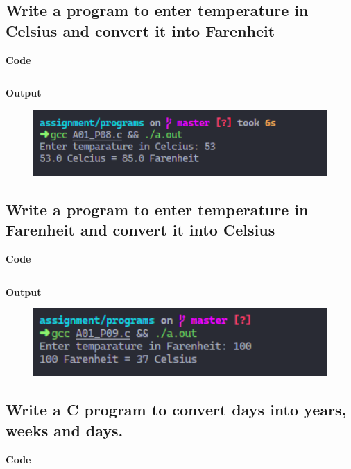 \documentclass[a4paper]{article}
\begin{document}
\newpage



\subsection{Write a program to enter temperature in Celsius and convert it into Farenheit}
\textbf{Code}

\inputminted{C}{programs/A01_P08.c}

\textbf{Output}

\begin{figure}[h]
  \includegraphics[width=12cm]{A01_P08}
\end{figure}

\newpage



\subsection{Write a program to enter temperature in Farenheit and convert it into Celsius}
\textbf{Code}

\inputminted{C}{programs/A01_P09.c}

\textbf{Output}

\begin{figure}[h]
  \includegraphics[width=12cm]{A01_P09}
\end{figure}

\newpage



\subsection{Write a C program to convert days into years, weeks and days.}
\textbf{Code}
\end{document}
